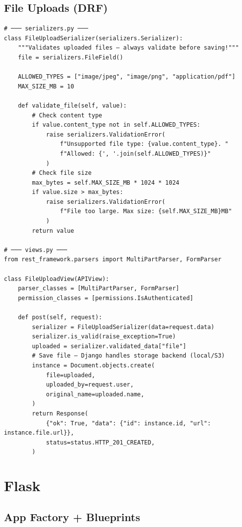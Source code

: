 \documentclass[10pt, a4paper]{article}
\begin{document}
\subsection{File Uploads (DRF)}


\begin{lstlisting}[language=mypython]
# ─── serializers.py ───
class FileUploadSerializer(serializers.Serializer):
    """Validates uploaded files — always validate before saving!"""
    file = serializers.FileField()
    
    ALLOWED_TYPES = ["image/jpeg", "image/png", "application/pdf"]
    MAX_SIZE_MB = 10
    
    def validate_file(self, value):
        # Check content type
        if value.content_type not in self.ALLOWED_TYPES:
            raise serializers.ValidationError(
                f"Unsupported file type: {value.content_type}. "
                f"Allowed: {', '.join(self.ALLOWED_TYPES)}"
            )
        # Check file size
        max_bytes = self.MAX_SIZE_MB * 1024 * 1024
        if value.size > max_bytes:
            raise serializers.ValidationError(
                f"File too large. Max size: {self.MAX_SIZE_MB}MB"
            )
        return value

# ─── views.py ───
from rest_framework.parsers import MultiPartParser, FormParser

class FileUploadView(APIView):
    parser_classes = [MultiPartParser, FormParser]
    permission_classes = [permissions.IsAuthenticated]
    
    def post(self, request):
        serializer = FileUploadSerializer(data=request.data)
        serializer.is_valid(raise_exception=True)
        uploaded = serializer.validated_data["file"]
        # Save file — Django handles storage backend (local/S3)
        instance = Document.objects.create(
            file=uploaded,
            uploaded_by=request.user,
            original_name=uploaded.name,
        )
        return Response(
            {"ok": True, "data": {"id": instance.id, "url": instance.file.url}},
            status=status.HTTP_201_CREATED,
        )
\end{lstlisting}


\bigskip


\section{Flask}


\subsection{App Factory + Blueprints}
\end{document}
